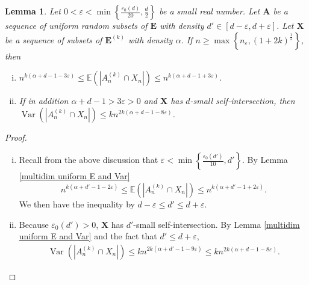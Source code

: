 \documentclass{article}
\DeclareMathOperator{\Var}{Var}
\newcommand{\bs}{\boldsymbol}
\newcommand\esp[1]{\mathbb{E}\left( #1 \right)}
\newtheorem{lem}[thm]{Lemma}
\theoremstyle{remark}
\begin{document}
\begin{lem}\label{multidim uniformly uniform E and Var} 
Let $0 < \varepsilon < \min\left\{ \frac{\varepsilon_0(d)}{20}, \frac{d}{2} \right\}$ be a small real number. Let $\bs A$ be a sequence of uniform random subsets of $\bs E$ with density $d'\in [d-\varepsilon,d+\varepsilon]$. Let $\bs X$ be a sequence of subsets of $\bs E^{(k)}$ with density $\alpha$. If $n\geq \max\left\{n_\varepsilon,(1+2k)^{\frac{1}{\varepsilon}}\right\}$, then
\begin{enumerate}[(i)]
    \item $n^{k(\alpha + d -1 - 3\varepsilon)} \leq \esp{|A_n^{(k)}\cap  X_n|} \leq n^{k(\alpha + d -1 + 3\varepsilon)}$.
    \item If in addition $\alpha+d-1>3\varepsilon>0$ and $\bs X$ has $d$-small self-intersection, then\\ $\Var(|A_n^{(k)}\cap X_n|)\leq kn^{2k(\alpha+d-1-8\varepsilon)}$.
\end{enumerate}
\end{lem}
\begin{proof}\quad
    \begin{enumerate} [(i)]
        \item Recall from the above discussion that $\varepsilon < \min\left\{\frac{\varepsilon_0(d')}{10},d'\right\}$. By Lemma \ref{multidim uniform E and Var}
        \[n^{k(\alpha + d' -1 - 2\varepsilon)} \leq \esp{|A_n^{(k)}\cap  X_n|} \leq n^{k(\alpha + d' -1 + 2\varepsilon)}.\]
        We then have the inequality by $d-\varepsilon\leq d'\leq d+\varepsilon$.
        \item  Because $\varepsilon_0(d')>0$, $\bs X$ has $d'$-small self-intersection. By Lemma \ref{multidim uniform E and Var} and the fact that $d'\leq d+\varepsilon$,
        \begin{align*}\Var(|A_n^{(k)}\cap  X_n|) \leq kn^{2k(\alpha+d'-1-9\varepsilon)} \leq kn^{2k(\alpha+d-1-8\varepsilon)}.
        \end{align*}
    \end{enumerate}
\end{proof}
\end{document}
